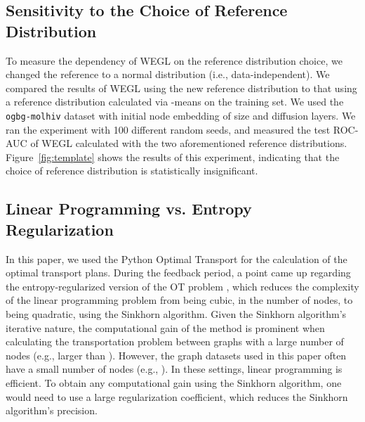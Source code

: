 \documentclass[table]{article} \usepackage{iclr2021_conference,times}
\begin{document}
\subsection{Sensitivity to the Choice of Reference Distribution}
\label{sec:appx:sensitivity_reference}

To measure the dependency of WEGL on the reference distribution choice, we changed the reference to a normal distribution (i.e., data-independent). We compared the results of WEGL using the new reference distribution to that using a reference distribution calculated via -means on the training set. We used the \texttt{ogbg-molhiv} dataset with initial node embedding of size  and  diffusion layers. We ran the experiment with 100 different random seeds, and measured the test ROC-AUC of WEGL calculated with the two aforementioned reference distributions. Figure~\ref{fig:template} shows the results of this experiment, indicating that the choice of reference distribution is statistically insignificant.

\subsection{Linear Programming vs. Entropy Regularization}

In this paper, we used the Python Optimal Transport \citep{flamary2017pot} for the calculation of the optimal transport plans. During the feedback period, a point came up regarding the entropy-regularized version of the OT problem \citep{cuturi2014fast}, which reduces the complexity of the linear programming problem from being cubic, in the number of nodes, to being quadratic, using the Sinkhorn algorithm. Given the Sinkhorn algorithm's iterative nature, the computational gain of the method is prominent when calculating the transportation problem between graphs with a large number of nodes (e.g., larger than ). However, the graph datasets used in this paper often have a small number of nodes (e.g., ). In these settings, linear programming is efficient. To obtain any computational gain using the Sinkhorn algorithm, one would need to use a large regularization coefficient, which reduces the Sinkhorn algorithm's precision. 
\end{document}
